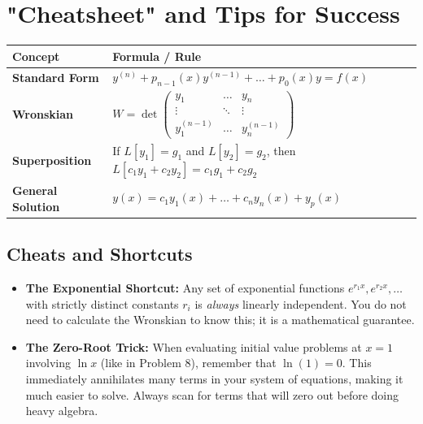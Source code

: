 \documentclass[11pt, a4paper]{article}
\theoremstyle{definition}
\theoremstyle{remark}
\begin{document}
\newpage
\section{"Cheatsheet" and Tips for Success}

\renewcommand{\arraystretch}{1.5}
\begin{table}[h]
\centering
\begin{tabularx}{\textwidth}{>{\hsize=0.3\hsize}X >{\hsize=0.7\hsize}X}
\toprule
\textbf{Concept} & \textbf{Formula / Rule} \\
\midrule
\textbf{Standard Form} & $y^{(n)} + p_{n-1}(x)y^{(n-1)} + \dots + p_0(x)y = f(x)$ \\
\addlinespace[4pt]
\textbf{Wronskian} & $W = \det \begin{pmatrix} y_1 & \dots & y_n \\ \vdots & \ddots & \vdots \\ y_1^{(n-1)} & \dots & y_n^{(n-1)} \end{pmatrix}$ \\
\addlinespace[4pt]
\textbf{Superposition} & If $L[y_1] = g_1$ and $L[y_2] = g_2$, then $L[c_1 y_1 + c_2 y_2] = c_1 g_1 + c_2 g_2$ \\
\addlinespace[4pt]
\textbf{General Solution} & $y(x) = c_1 y_1(x) + \dots + c_n y_n(x) + y_p(x)$ \\
\bottomrule
\end{tabularx}
\end{table}

\subsection{Cheats and Shortcuts}
\begin{itemize}
    \item \textbf{The Exponential Shortcut:} Any set of exponential functions $e^{r_1 x}, e^{r_2 x}, \dots$ with strictly distinct constants $r_i$ is \textit{always} linearly independent. You do not need to calculate the Wronskian to know this; it is a mathematical guarantee.
    \item \textbf{The Zero-Root Trick:} When evaluating initial value problems at $x=1$ involving $\ln x$ (like in Problem 8), remember that $\ln(1) = 0$. This immediately annihilates many terms in your system of equations, making it much easier to solve. Always scan for terms that will zero out before doing heavy algebra.
\end{itemize}
\end{document}

